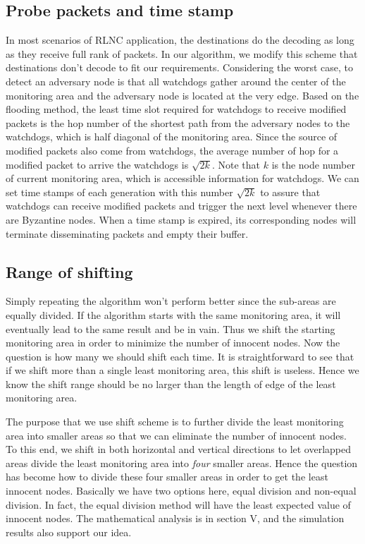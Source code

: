 \documentclass[conference]{IEEEtran}
\begin{document}
\subsection{Probe packets and time stamp} In most scenarios of RLNC application, the destinations do the decoding as long as they receive full rank of packets. In our algorithm, we modify this scheme that destinations don't decode to fit our requirements. Considering the worst case, to detect an adversary node is that all watchdogs gather around the center of the monitoring area and the adversary node is located at the very edge. Based on the flooding method, the least time slot required for watchdogs to receive modified packets is the hop number of the shortest path from the adversary nodes to the watchdogs, which is half diagonal of the monitoring area. Since the source of modified packets also come from watchdogs, the average number of hop for a modified packet to arrive the watchdogs is $\sqrt{2k}$. Note that $k$ is the node number of current monitoring area, which is accessible information for watchdogs. We can set time stamps of each generation with this number $\sqrt{2k}$ to assure that watchdogs can receive modified packets and trigger the next level whenever there are Byzantine nodes. When a time stamp is expired, its corresponding nodes will terminate disseminating packets and empty their buffer.
\subsection{Range of shifting}
Simply repeating the algorithm won't perform better since the sub-areas are equally divided. If the algorithm starts with the same monitoring area, it will eventually lead to the same result and be in vain. Thus we shift the starting monitoring area in order to minimize the number of innocent nodes. Now the question is how many we should shift each time. It is straightforward to see that if we shift more than a single least monitoring area, this shift is useless. Hence we know the shift range should be no larger than the length of edge of the least monitoring area. 


The purpose that we use shift scheme is to further divide the least monitoring area into smaller areas so that we can eliminate the number of innocent nodes. To this end, we shift in both horizontal and vertical directions to let overlapped areas divide the least monitoring area into \emph{four} smaller areas. Hence the question has become how to divide these four smaller areas in order to get the least innocent nodes. Basically we have two options here, equal division and non-equal division. In fact, the equal division method will have the least expected value of innocent nodes. The mathematical analysis is in section V, and the simulation results also support our idea.
\end{document}
